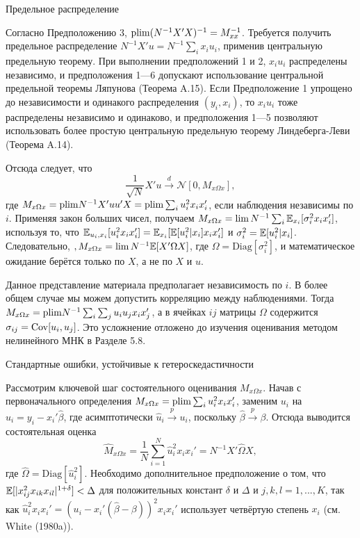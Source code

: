 \begin{center}
Предельное распределение
\end{center}

Согласно Предположению 3,  $\mathrm{plim } (N^{-1} X'X)^{-1}=M_{xx}^{-1}$. Требуется получить предельное распределение $N^{-1}X'u=N^{-1}\sum_i x_i u_i$, применив центральную предельную теорему. При выполнении предположений 1 и 2, $x_i u_i$ распределены независимо, и предположения 1---6 допускают использование центральной предельной теоремы Ляпунова (Теорема A.15). Если Предположение 1 упрощено до независимости и одинакого распределения $(y_i,x_i)$, то $x_i u_i$ тоже распределены независимо и одинаково, и предположения 1---5 позволяют использовать более простую центральную предельную теорему Линдеберга-Леви (Теорема A.14).

Отсюда следует, что 
\begin{equation}
\frac{1}{\sqrt{N}}X'u \xrightarrow{d} \mathcal{N} [0,M_{x \Omega x}],
\end{equation}
где $M_{x \Omega x} =\mathrm{plim } N^{-1} X'uu'X = \mathrm{plim } \sum_i u_i^2 x_i x_i'$, если наблюдения независимы по $i$. Применяя закон больших чисел, получаем $M_{x \Omega x} = \lim N^{-1} \sum_i \mathbb{E}_{x_i}[\sigma_i^2 x_i x_i']$, используя то, что $\mathbb{E}_{u_i,x_i}[u_i^2 x_i x_i'] = \mathbb{E}_{x_i}[\mathbb{E}[u_i^2|x_i]x_i x_i']$ и $\sigma_i^2 = \mathbb{E}[u_i^2|x_i]$. Следовательно, $,M_{x \Omega x} = \lim N^{-1} \mathbb{E}[X'\Omega X]$, где $\Omega = \mathrm{Diag}[\sigma_i^2]$, и математическое ожидание берётся только по $X$, а не по $X$ и $u$.

Данное представление материала предполагает независимость по $i$. В более общем случае мы можем допустить корреляцию между наблюдениями. Тогда $M_{x\Omega x} = \mathrm{plim } N^{-1} \sum_i \sum_j u_i u_j x_i x_j'$, а в ячейках $ij$ матрицы $\Omega$ содержится $\sigma_{ij} = \mathrm{Cov}[u_i, u_j]$. Это усложнение отложено до изучения оценивания методом нелинейного МНК в Разделе 5.8.

\begin{center}
Стандартные ошибки, устойчивые к гетероскедастичности
\end{center}

Рассмотрим ключевой шаг состоятельного оценивания $M_{x \Omega x}$. Начав с первоначального определения $M_{x \Omega x} = \mathrm{plim } \sum_i u_i^2 x_i x_i'$, заменим $u_i$ на $\hat{u}_i = y_i-x_i'\hat{\beta}$, где асимптотически  $\hat{u}_i \xrightarrow{p} u_i$, поскольку $\hat{\beta} \xrightarrow{p} \beta$. Отсюда выводится состоятельная оценка
\begin{equation}
\hat{M}_{x \Omega x} = \frac{1}{N} \sum_{i=1}^{N}\hat{u}_i^2 x_i x_i' = N^{-1} X' \hat{\Omega} X,
\end{equation}
где $\hat{\Omega} = \mathrm{Diag}[\hat{u}_i^2]$. Необходимо дополнительное предположение о том, что $\mathbb{E} [|x_{ij}^2 x_{ik} x_{il}|^{1+\delta}]< \Delta$ для положительных констант $\delta$  и $\Delta$ и $j,k,l = 1, ..., K$, так как $\hat{u}_i^2 x_i x_i' = (u_i - x_i'(\hat{\beta} - \beta))^2 x_i x_i'$ использует четвёртую степень $x_i$ (см. White (1980a)).

